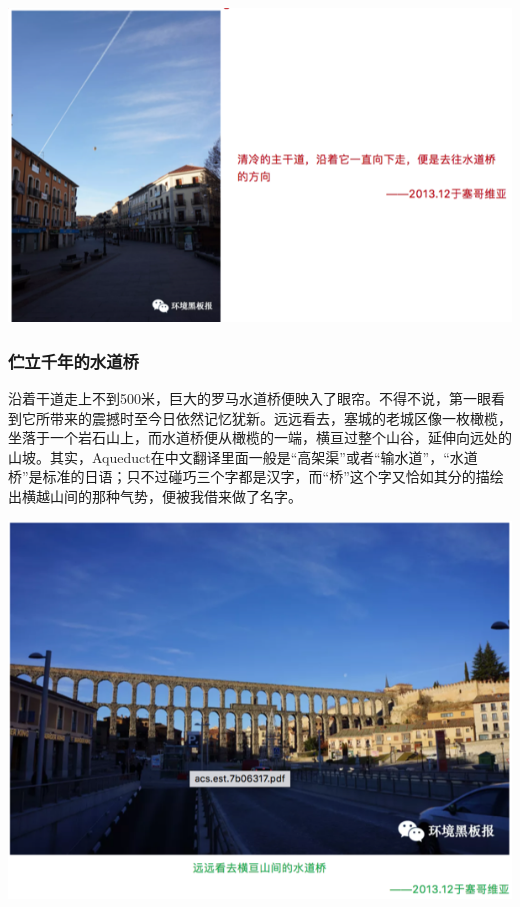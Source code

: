 \documentclass[
]{book}
\begin{document}
\includegraphics[width=8.33in]{images/xt43}

\hypertarget{ux4f2bux7acbux5343ux5e74ux7684ux6c34ux9053ux6865}{%
\subsubsection{伫立千年的水道桥}\label{ux4f2bux7acbux5343ux5e74ux7684ux6c34ux9053ux6865}}

沿着干道走上不到500米，巨大的罗马水道桥便映入了眼帘。不得不说，第一眼看到它所带来的震撼时至今日依然记忆犹新。远远看去，塞城的老城区像一枚橄榄，坐落于一个岩石山上，而水道桥便从橄榄的一端，横亘过整个山谷，延伸向远处的山坡。其实，Aqueduct在中文翻译里面一般是``高架渠''或者``输水道''，``水道桥''是标准的日语；只不过碰巧三个字都是汉字，而``桥''这个字又恰如其分的描绘出横越山间的那种气势，便被我借来做了名字。

\includegraphics[width=8.33in]{images/xt44}
\end{document}
